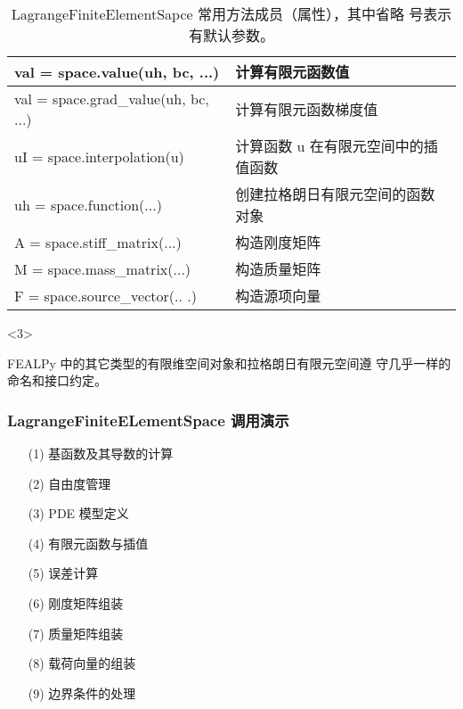 \documentclass{beamer}
\numberwithin{subsection}{section}
\begin{document}
\begin{frame}
\begin{onlyenv}
\begin{table}[H]
\begin{tabular}{|l|l|}
                \\\hline
                val = space.value(uh, bc, ...) & 计算有限元函数值
                \\\hline
                val = space.grad\_value(uh, bc, ...) & 计算有限元函数梯度值 \\\hline
                uI = space.interpolation(u) & 计算函数 u 在有限元空间中的插值函数
                \\\hline
                uh = space.function(...) &  创建拉格朗日有限元空间的函数对象
                \\\hline
                A = space.stiff\_matrix(...) & 构造刚度矩阵
                \\\hline
                M = space.mass\_matrix(...) & 构造质量矩阵
                \\\hline
                F = space.source\_vector(.. .) & 构造源项向量
                \\\hline
            \end{tabular}
            \caption{ LagrangeFiniteElementSapce 常用方法成员（属性），其中省略
            号表示有默认参数。}
        \end{table}
    \end{onlyenv}
    \begin{onlyenv}<3>
        \begin{remark}
            FEALPy 中的其它类型的有限维空间对象和拉格朗日有限元空间遵
            守几乎一样的命名和接口约定。
        \end{remark}
    \end{onlyenv}
\end{frame}

\begin{frame}
    \frametitle{LagrangeFiniteELementSpace 调用演示}
    \begin{itemize}
        \item[(1)] 基函数及其导数的计算
        \item[(2)] 自由度管理
        \item[(3)] PDE 模型定义
        \item[(4)] 有限元函数与插值
        \item[(5)] 误差计算 
        \item[(6)] 刚度矩阵组装
        \item[(7)] 质量矩阵组装
        \item[(8)] 载荷向量的组装
        \item[(9)] 边界条件的处理
    \end{itemize}
\end{frame}
\end{document}
